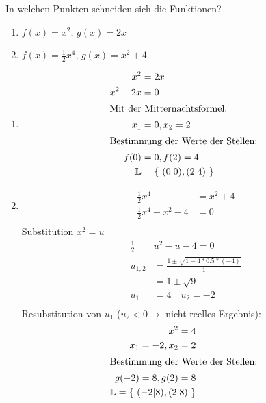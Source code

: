  In welchen Punkten schneiden sich die Funktionen?
\begin{multicols}{3}
  \begin{enumerate}
    \item $f(x) = x^2$, $g(x) = 2x$
    \item $f(x) = \frac 1 2 x^4$, $g(x) = x^2+4$
  \end{enumerate}
\end{multicols}
\begin{lsg}{}
  \begin{multicols}{2}
    \begin{enumerate}
      \item \begin{align*}
        x^2 &= 2x\\
        x^2-2x &= 0\\
        \intertext{Mit der Mitternachtsformel: }
        x_1 &= 0, x_2 =2\\
        \intertext{Bestimmung der Werte der Stellen: }
        f(0) &= 0, f(2) = 4\\
        \mathbb{L} &= \left\{\ (0|0),(2|4) \ \right\}
      \end{align*}

      \columnbreak
      \item
      \begin{align*}
        \frac 1 2 x^4 &= x^2+4\\
        \frac 1 2 x^4 -x^2 -4 &= 0\\
      \end{align*}
      Substitution $x^2=u$
      \begin{align*}
        \frac 1 2& u^2 -u -4 = 0\\
        u_{1,2}&=\frac{1\pm\sqrt{1-4*0.5*(-4)}}{1}\\
        &= 1\pm\sqrt{9}\\
        u_1 &= 4\quad u_2=-2\\
      \end{align*}
      Resubstitution von $u_1$ ($u_2 < 0 \rightarrow $ nicht reelles Ergebnis):
      \begin{align*}
        x^2=4\\
        x_1 = -2, x_2 = 2\\
        \intertext{Bestimmung der Werte der Stellen: }
        g(-2)=8, g(2)=8\\
        \mathbb{L} = \left\{\ (-2|8),(2|8) \ \right\}
      \end{align*}
    \end{enumerate}
  \end{multicols}
\end{lsg}


